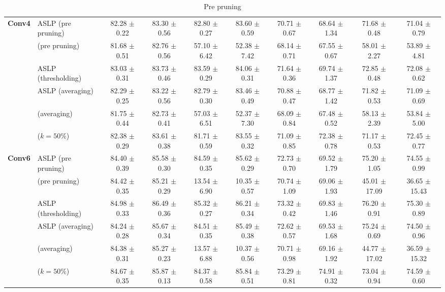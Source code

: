 \begin{table}
{\begin{tabular}{llcccccccc}
       \multirow{6}{*}{\textbf{Conv4}} & ASLP (pre pruning) & 82.28 $\pm$ 0.22 & 83.30 $\pm$ 0.56 & 82.80 $\pm$ 0.27 & 83.60 $\pm$ 0.59 & 70.71 $\pm$ 0.67 & 68.64 $\pm$ 1.34 & 71.68 $\pm$ 0.48 & 71.04 $\pm$ 0.79 \\
        & \cite{DBLP:conf/nips/ZhouLLY19} (pre pruning) & 81.68 $\pm$ 0.51 & 82.76 $\pm$ 0.56 & 57.10 $\pm$ 6.42 & 52.38 $\pm$ 7.42 & 68.14 $\pm$ 0.71 & 67.55 $\pm$ 0.67 & 58.01 $\pm$ 2.27 & 53.89 $\pm$ 4.81 \\
      \cline{2-10}
        & ASLP (thresholding) & 83.03 $\pm$ 0.31 & 83.73 $\pm$ 0.46 & 83.59 $\pm$ 0.29 & 84.06 $\pm$ 0.31 & 71.64 $\pm$ 0.36 & 69.74 $\pm$ 1.37 & 72.85 $\pm$ 0.48 & 72.08 $\pm$ 0.62 \\
        & ASLP (averaging)& 82.29 $\pm$ 0.25 & 83.22 $\pm$ 0.56 & 82.79 $\pm$ 0.30 & 83.46 $\pm$ 0.49 & 70.88 $\pm$ 0.47 & 68.77 $\pm$ 1.42 & 71.82 $\pm$ 0.53 & 71.09 $\pm$ 0.69 \\
        & \cite{DBLP:conf/nips/ZhouLLY19} (averaging)& 81.75 $\pm$ 0.44 & 82.73 $\pm$ 0.41 & 57.03 $\pm$ 6.51 & 52.37 $\pm$ 7.30 & 68.09 $\pm$ 0.84 & 67.48 $\pm$ 0.52 & 58.13 $\pm$ 2.39 & 53.84 $\pm$ 5.00 \\
        & \cite{DBLP:conf/cvpr/RamanujanWKFR20} ($k=50\%$) & 82.38 $\pm$ 0.29 & 83.61 $\pm$ 0.38 & 81.71 $\pm$ 0.59 & 83.55 $\pm$ 0.32 & 71.09 $\pm$ 0.85 & 72.38 $\pm$ 0.78 & 71.17 $\pm$ 0.53 & 72.45 $\pm$ 0.77 \\
      \midrule

       \multirow{6}{*}{\textbf{Conv6}} & ASLP (pre pruning) & 84.40 $\pm$ 0.39 & 85.58 $\pm$ 0.30 & 84.59 $\pm$ 0.35 & 85.62 $\pm$ 0.29 & 72.73 $\pm$ 0.70 & 69.52 $\pm$ 1.79 & 75.20 $\pm$ 1.05 & 74.55 $\pm$ 0.99 \\
        & \cite{DBLP:conf/nips/ZhouLLY19} (pre pruning) & 84.42 $\pm$ 0.35 & 85.21 $\pm$ 0.29 & 13.54 $\pm$ 6.90 & 10.35 $\pm$ 0.57 & 70.74 $\pm$ 1.09 & 69.06 $\pm$ 1.93 & 45.01 $\pm$ 17.09 & 36.65 $\pm$ 15.43 \\
      \cline{2-10}
        & ASLP (thresholding) & 84.98 $\pm$ 0.33 & 86.49 $\pm$ 0.36 & 85.32 $\pm$ 0.27 & 86.21 $\pm$ 0.34 & 73.32 $\pm$ 0.42 & 69.83 $\pm$ 1.46 & 76.20 $\pm$ 0.91 & 75.30 $\pm$ 0.89 \\
        & ASLP (averaging)& 84.24 $\pm$ 0.28 & 85.67 $\pm$ 0.34 & 84.51 $\pm$ 0.35 & 85.49 $\pm$ 0.38 & 72.62 $\pm$ 0.57 & 69.53 $\pm$ 1.68 & 75.24 $\pm$ 0.69 & 74.50 $\pm$ 0.96 \\
        & \cite{DBLP:conf/nips/ZhouLLY19} (averaging) & 84.38 $\pm$ 0.31 & 85.27 $\pm$ 0.23 & 13.57 $\pm$ 6.88 & 10.37 $\pm$ 0.56 & 70.71 $\pm$ 0.98 & 69.16 $\pm$ 1.92 & 44.77 $\pm$ 17.02 & 36.59 $\pm$ 15.32 \\
        & \cite{DBLP:conf/cvpr/RamanujanWKFR20} ($k=50\%$) & 84.67 $\pm$ 0.35 & 85.87 $\pm$ 0.13 & 84.37 $\pm$ 0.58 & 85.84 $\pm$ 0.51 & 73.29 $\pm$ 0.81 & 74.91 $\pm$ 0.32 & 73.04 $\pm$ 0.94 & 74.59 $\pm$ 0.60 \\
      \bottomrule
    \end{tabular}
  }
  \caption{Pre pruning}
  
\end{table}

